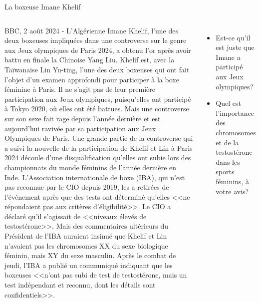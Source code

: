 \begin{frame}{La boxeuse Imane Khelif}
  \begin{columns}[t]
    \scriptsize
      BBC, 2 août 2024 - L'Algérienne Imane Khelif, l'une des deux boxeuses impliquées dans une controverse sur le genre aux Jeux olympiques de Paris 2024, a obtenu l'or après avoir battu en finale la Chinoise Yang Liu.
      Khelif est, avec la Taïwanaise Lin Yu-ting, l'une des deux boxeuses qui ont fait l'objet d'un examen approfondi pour participer à la boxe féminine à Paris.
      Il ne s'agit pas de leur première participation aux Jeux olympiques, puisqu'elles ont participé à Tokyo 2020, où elles ont été battues.
      Mais une controverse sur son sexe fait rage depuis l'année dernière et est aujourd'hui ravivée par sa participation aux Jeux Olympiques de Paris.
      Une grande partie de la controverse qui a suivi la nouvelle de la participation de Khelif et Lin à Paris 2024 découle d'une disqualification qu'elles ont subie lors des championnats du monde féminins de l'année dernière en Inde.
      L'Association internationale de boxe (IBA), qui n'est pas reconnue par le CIO depuis 2019, les a retirées de l'événement après que des tests ont
      déterminé qu'elles <<ne répondaient pas aux critères d'éligibilité>>.
      Le CIO a déclaré qu'il s'agissait de <<niveaux élevés de testostérone>>.
      Mais des commentaires ultérieurs du Président de l'IBA auraient insinué que Khelif et Lin n'avaient pas les chromosomes XX du sexe biologique féminin, mais XY du sexe masculin.
      Après le combat de jeudi, l'IBA a publié un communiqué indiquant que les boxeuses <<n'ont pas subi de test de testostérone, mais un test indépendant et reconnu, dont les détails sont confidentiels>>.
      \begin{itemize}
        \small
        \item Est-ce qu'il est juste que Imane a participé aux Jeux olympiques?
        \item Quel est l'importance des chromosomes et de la testostérone dans les sports féminins, à votre avis?
      \end{itemize}
  \end{columns}
\end{frame}